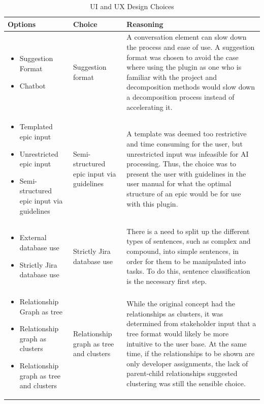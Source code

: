 \begin{table}[!h]
	\caption{UI and UX Design Choices}
	\begin{tabularx}{\textwidth}{|p{3cm}|p{3cm}|X|}
	\hline
	Options & Choice & Reasoning\\
	\hline
	\begin{itemize}
		\item Suggestion Format
		\item Chatbot
	\end{itemize} &
	Suggestion format & A conversation element can slow down the process and ease of use. A suggestion format was chosen to avoid the case where using the plugin as one who is familiar with the project and decomposition methods would slow down a decomposition process instead of accelerating it.\\
	\hline
	\begin{itemize}
		\item Templated epic input
		\item Unrestricted epic input
		\item Semi-structured epic input via guidelines
	\end{itemize} &
	Semi-structured epic input via guidelines & A template was deemed too restrictive and time consuming for the user, but unrestricted input was infeasible for AI processing. Thus, the choice was to present the user with guidelines in the user manual for what the optimal structure of an epic would be for use with this plugin.\\
	\hline	
	\begin{itemize}
		\item External database use
		\item Strictly Jira database use
	\end{itemize} & 
	Strictly Jira database use & There is a need to split up the different types of sentences, such as complex and compound, into simple sentences, in order for them to be manipulated into tasks. To do this, sentence classification is the necessary first step.\\
	\hline
	\begin{itemize}
		\item Relationship Graph as tree
		\item Relationship graph as clusters
		\item Relationship graph as tree and clusters
	\end{itemize} & 
	Relationship graph as tree and clusters & While the original concept had the relationships as clusters, it was determined from stakeholder input that a tree format would likely be more intuitive to the user base. At the same time, if the relationships to be shown are only developer assignments, the lack of parent-child relationships suggested clustering was still the sensible choice.\\

\end{tabularx}
\end{table}
